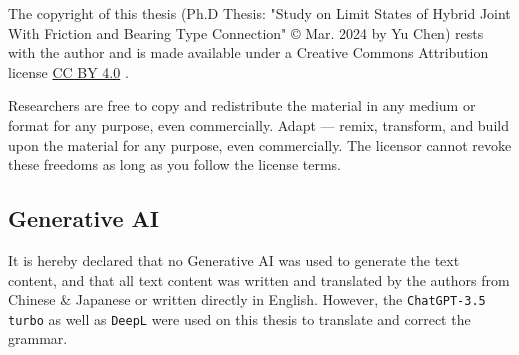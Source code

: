 The copyright of this thesis (Ph.D Thesis: "Study on Limit States of Hybrid Joint With Friction and Bearing Type Connection" © Mar. 2024 by Yu Chen) rests with the author and is made available under a Creative Commons Attribution license \hyperlink{https://creativecommons.org/licenses/by/4.0/}{CC BY 4.0} \ccby. 

Researchers are free to copy and redistribute the material in any medium or format for any purpose, even commercially. Adapt — remix, transform, and build upon the material for any purpose, even commercially. The licensor cannot revoke these freedoms as long as you follow the license terms.

\subsection*{Generative AI}

It is hereby declared that no Generative AI was used to generate the text content, and that all text content was written and translated by the authors from Chinese \& Japanese or written directly in English. However, the \texttt{ChatGPT-3.5 turbo} as well as \texttt{DeepL} were used on this thesis to translate and correct the grammar.